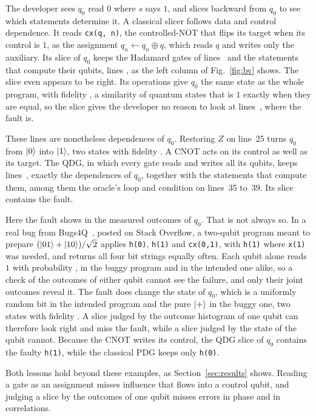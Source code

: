 The developer sees $q_0$ read $0$ where $s$ says $1$, and slices backward from $q_0$ to see which
statements determine it. A classical slicer follows data and control dependence. It reads
\texttt{cx(q, n)}, the controlled-NOT that flips its target when its control is $1$, as the assignment
$q_n \leftarrow q_n \oplus q$, which reads $q$ and writes only the auxiliary. Its slice of $q_0$ keeps the
Hadamard gates of lines~\numBvCpdgLines{} and the statements that compute their qubits, lines
\numBvCpdgClassical{}, as the left column of Fig.~\ref{fig:bv} shows. The slice even appears to be right.
Its \numBvCpdgOps{} operations give $q_0$ the same state as the whole program, with fidelity
\numBvCpdgFidelity{}, a similarity of quantum states that is $1$ exactly when they are equal, so the slice
gives the developer no reason to look at lines~\numBvMissedLines{}, where the fault is.

These lines are nonetheless dependences of $q_0$. Restoring $Z$ on line~25 turns $q_0$ from $\lvert 0\rangle$ into
$\lvert 1\rangle$, two states with fidelity \numBvFixFidelity{}. A CNOT acts on its control as well as its target.
The QDG, in which every gate reads and writes all its qubits, keeps lines~\numBvQdgLines{}, exactly the
dependences of $q_0$, together with the statements that compute them, among them the oracle's loop and
condition on lines~35 to~39. Its slice contains the fault.

Here the fault shows in the measured outcomes of $q_0$. That is not always so. In a real bug from
Bugs4Q~\cite{zhao2023bugs4q}, posted on Stack Overflow, a two-qubit program meant to prepare
$(\lvert 01\rangle+\lvert 10\rangle)/\sqrt{2}$ applies \texttt{h(0)}, \texttt{h(1)} and \texttt{cx(0,1)}, with \texttt{h(1)}
where \texttt{x(1)} was needed, and returns all four bit strings equally often. Each qubit alone reads $1$ with probability \numMotPOne{}, in the buggy program
and in the intended one alike, so a check of the outcomes of either qubit cannot see the failure, and only
their joint outcomes reveal it. The fault does change the state of $q_0$, which is a uniformly random bit
in the intended program and the pure $\lvert +\rangle$ in the buggy one, two states with fidelity
\numMotFidelity{}. A slice judged by the outcome histogram of one
qubit can therefore look right and miss the fault, while a slice judged by the state of the qubit cannot.
Because the CNOT writes its control,
the QDG slice of $q_0$ contains the faulty \texttt{h(1)}, while the classical PDG keeps only \texttt{h(0)}.

Both lessons hold beyond these examples, as Section~\ref{sec:results} shows. Reading a gate as an assignment misses influence that flows into a control qubit,
and judging a slice by the outcomes of one qubit misses errors in phase and in correlations.

